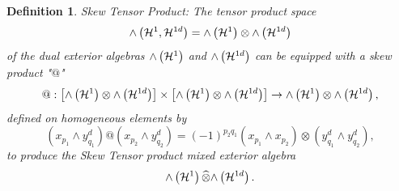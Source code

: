 \documentclass[aps,preprint]{revtex4}%
\newtheorem{definition}[theorem]{Definition}
\begin{document}
\begin{definition}
\emph{Skew Tensor Product: }The tensor product space
\begin{equation}
{\huge \wedge}\left(  \mathcal{H}^{1},\mathcal{H}^{1d}\right)  ={\huge \wedge
}\left(  \mathcal{H}^{1}\right)  \otimes{\huge \wedge}\left(  \mathcal{H}%
^{1d}\right)
\end{equation}
of the dual exterior algebras ${\huge \wedge}\left(  \mathcal{H}^{1}\right)  $
and ${\huge \wedge}\left(  \mathcal{H}^{1d}\right)  $ can be equipped with a
\emph{skew product} "$@$"%
\begin{equation}
@:\left[  {\huge \wedge}\left(  \mathcal{H}^{1}\right)  \otimes{\huge \wedge
}\left(  \mathcal{H}^{1d}\right)  \right]  \times\left[  {\huge \wedge}\left(
\mathcal{H}^{1}\right)  \otimes{\huge \wedge}\left(  \mathcal{H}^{1d}\right)
\right]  \rightarrow{\huge \wedge}\left(  \mathcal{H}^{1}\right)
\otimes{\huge \wedge}\left(  \mathcal{H}^{1d}\right)  ,
\end{equation}
defined on \emph{homogeneous} elements by
\begin{equation}
\left(  x_{p_{1}}\wedge y_{q_{1}}^{d}\right)  @\left(  x_{p_{2}}\wedge
y_{q_{2}}^{d}\right)  =\left(  -1\right)  ^{p_{2}q_{1}}\left(  x_{p_{1}}\wedge
x_{p_{2}}\right)  \otimes\left(  y_{q_{1}}^{d}\wedge y_{q_{2}}^{d}\right)  ,
\end{equation}
to produce the \emph{Skew Tensor} product mixed exterior algebra
\begin{equation}
{\huge \wedge}\left(  \mathcal{H}^{1}\right)  \widehat{\otimes}{\huge \wedge
}\left(  \mathcal{H}^{1d}\right)  .
\end{equation}

\end{definition}
\end{document}
